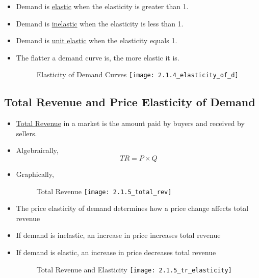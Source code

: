\begin{itemize}

\item Demand is \underline{elastic} when the elasticity is greater than 1.

\item Demand is \underline{inelastic} when the elasticity is less than 1.

\item Demand is \underline{unit elastic} when the elasticity equals 1.

\item The flatter a demand curve is, the more elastic it is.

\begin{figure}[h]
Elasticity of Demand Curves
\texttt{[image: 2.1.4\_elasticity\_of\_d]}
\centering
\end{figure}

\end{itemize}



\subsection{Total Revenue and Price Elasticity of Demand}

\begin{itemize}

\item \underline{Total Revenue} in a market is the amount paid by buyers and received by sellers.

\item Algebraically, \[TR = P \times Q\]

\newpage

\item Graphically, 

\begin{figure}[h]
Total Revenue
\centering
\texttt{[image: 2.1.5\_total\_rev]}
\end{figure}

\item The price elasticity of demand determines how a price change affects total revenue


\item If demand is inelastic, an increase in price increases total revenue

\item If demand is elastic, an increase in price decreases total revenue

\begin{figure}[h]
Total Revenue and Elasticity
\centering
\texttt{[image: 2.1.5\_tr\_elasticity]}
\end{figure}

\end{itemize}

